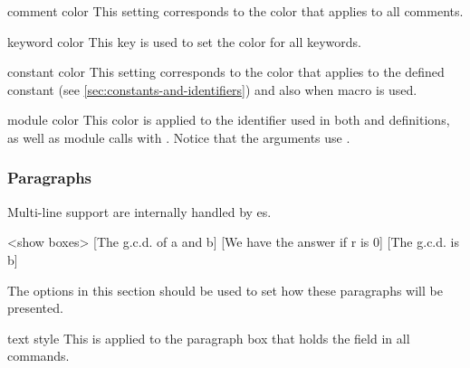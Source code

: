 \documentclass[a4paper, 11pt]{article}
\begin{document}
\begin{option}{comment color}{}
    This setting corresponds to the color that applies to all comments.
\end{option}

\begin{option}{keyword color}{}
    This key is used to set the color for all keywords.
\end{option}

\begin{option}{constant color}{}
    This setting corresponds to the color that applies to the defined constant (see \cref{sec:constants-and-identifiers}) and also when macro  is used.
\end{option}

\begin{option}{module color}{}
    This color is applied to the identifier used in both  and  definitions, as well as module calls with . Notice that the arguments use .
\end{option}

\subsubsection{Paragraphs}
Multi-line support are internally handled by es.

\medskip
\begingroup
\begin{algorithmic}<show boxes>
    [The g.c.d. of a and b]
        [We have the answer if r is 0]
        \EndWhile
        [The g.c.d. is b]
    \EndProcedure
\end{algorithmic}
\endgroup

\medskip
The options in this section should be used to set how these paragraphs will be presented.

\begin{option}{text style}{}
    This  is applied to the paragraph box that holds the  field in all commands.
\end{option}
\end{document}
